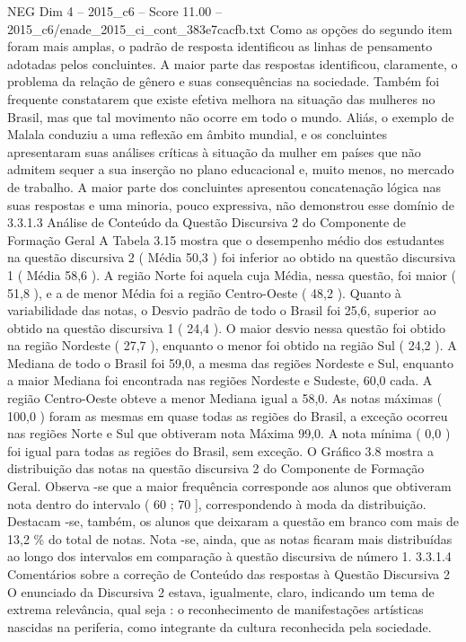 \begin{textsample}{NEG Dim 4 – 2015\_c6 – Score 11.00 – 2015\_c6/enade\_2015\_ci\_cont\_383e7cacfb.txt}
Como as opções do segundo item foram mais amplas, o padrão de resposta identificou as linhas de pensamento adotadas pelos concluintes.
A maior parte das respostas identificou, claramente, o problema da relação de gênero e suas consequências na sociedade.
Também foi frequente constatarem que existe efetiva melhora na situação das mulheres no Brasil, mas que tal movimento não ocorre em todo o mundo.
Aliás, o exemplo de Malala conduziu a uma reflexão em âmbito mundial, e os concluintes apresentaram suas análises críticas à situação da mulher em países que não admitem sequer a sua inserção no plano educacional e, muito menos, no mercado de trabalho.
A maior parte dos concluintes apresentou concatenação lógica nas suas respostas e uma minoria, pouco expressiva, não demonstrou esse domínio de 3.3.1.3 Análise de Conteúdo da Questão Discursiva 2 do Componente de Formação Geral A Tabela 3.15 mostra que o desempenho médio dos estudantes na questão discursiva 2 ( Média 50,3 ) foi inferior ao obtido na questão discursiva 1 ( Média 58,6 ).
A região Norte foi aquela cuja Média, nessa questão, foi maior ( 51,8 ), e a de menor Média foi a região Centro-Oeste ( 48,2 ).
Quanto à variabilidade das notas, o Desvio padrão de todo o Brasil foi 25,6, superior ao obtido na questão discursiva 1 ( 24,4 ).
O maior desvio nessa questão foi obtido na região Nordeste ( 27,7 ), enquanto o menor foi obtido na região Sul ( 24,2 ).
A Mediana de todo o Brasil foi 59,0, a mesma das regiões Nordeste e Sul, enquanto a maior Mediana foi encontrada nas regiões Nordeste e Sudeste, 60,0 cada.
A região Centro-Oeste obteve a menor Mediana igual a 58,0.
As notas máximas ( 100,0 ) foram as mesmas em quase todas as regiões do Brasil, a exceção ocorreu nas regiões Norte e Sul que obtiveram nota Máxima 99,0.
A nota mínima ( 0,0 ) foi igual para todas as regiões do Brasil, sem exceção.
O Gráfico 3.8 mostra a distribuição das notas na questão discursiva 2 do Componente de Formação Geral.
Observa -se que a maior frequência corresponde aos alunos que obtiveram nota dentro do intervalo ( 60 ; 70 ], correspondendo à moda da distribuição.
Destacam -se, também, os alunos que deixaram a questão em branco com mais de 13,2 \% do total de notas.
Nota -se, ainda, que as notas ficaram mais distribuídas ao longo dos intervalos em comparação à questão discursiva de número 1. 3.3.1.4 Comentários sobre a correção de Conteúdo das respostas à Questão Discursiva 2 O enunciado da Discursiva 2 estava, igualmente, claro, indicando um tema de extrema relevância, qual seja : o reconhecimento de manifestações artísticas nascidas na periferia, como integrante da cultura reconhecida pela sociedade.

\end{textsample}
